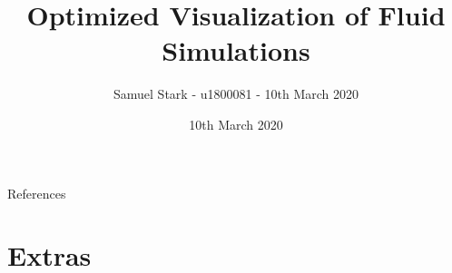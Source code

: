 \documentclass[9pt,aspectratio=169,hyphens]{beamer}
\date[]{10th March 2020}
\title[]{Optimized Visualization of Fluid Simulations}
\author[]{Samuel Stark - u1800081 - 10th March 2020}
\begin{document}
\maketitle

            
\newenvironment{wideitemize}{\itemize\itemsep1.3em}{\enditemize}


% 
% 







\begin{frame}[allowframebreaks]{References}
\def\newblock{}
\begingroup
\raggedright
\printbibliography[]
\endgroup
\end{frame}

\section*{Extras}
\appendsubframes
\end{document}
